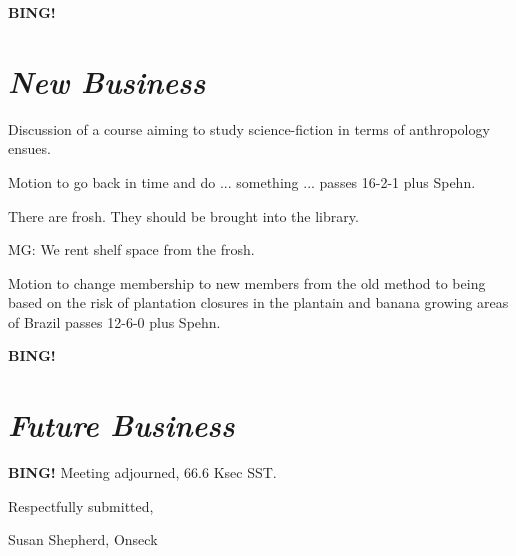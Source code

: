 \documentclass[10pt]{article}
\newcommand{\bing}{{\bf BING!} }
\newcommand{\goto}[1]{\bing \vskip 12pt \section*{{\em{#1}}}}
\newcommand{\ps}{ plus Spehn\xspace}
\begin{document}
\goto{New Business}

Discussion of a course aiming to study science-fiction in terms of anthropology ensues.

Motion to go back in time and do ... something ... passes 16-2-1\ps.

There are frosh. They should be brought into the library.

MG: We rent shelf space from the frosh.

Motion to change membership to new members from the old method to being based on the risk of plantation closures in the plantain and banana growing areas of Brazil passes 12-6-0 \ps.

\goto{Future Business}



\bing
\noindent
Meeting adjourned, 66.6 Ksec SST.

\vspace{18pt}

\centerline{Respectfully submitted,}
\centerline{Susan Shepherd, Onseck}
\end{document}
